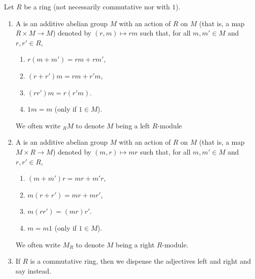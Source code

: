     \begin{definition}\label{def:modules}
        Let $R$ be a ring (not necessarily commutative nor with $1$).
        \begin{enumerate}[label = (\arabic*)]
            \item A  is an additive abelian group $M$ with an action of $R$ on $M$ (that is, a map $R \times M \rightarrow M$) denoted by $(r,m) \mapsto rm$ such that, for all $m,m' \in M$ and $r,r' \in R$,
                \begin{enumerate}[label = (\roman*)]
                    \item $r(m+m') = rm + rm'$,
                    \item $(r + r')m = rm + r'm$,
                    \item $(rr')m = r(r'm)$.
                    \item $1m = m$ \tiny (only if $1 \in M$).
                \end{enumerate}
            We often write ${}_{R}M$ to denote $M$ being a left $R$-module

            \item A  is an additive abelian group $M$ with an action of $R$ on $M$ (that is, a map $M \times R \rightarrow M$) denoted by $(m,r) \mapsto mr$ such that, for all $m,m' \in M$ and $r,r' \in R$,
                \begin{enumerate}[label = (\roman*)]
                    \item $(m+m')r = mr + m'r$,
                    \item $m(r + r') = mr + mr'$,
                    \item $m(rr') = (mr)r'$.
                    \item $m = m1$ \tiny (only if $1 \in M$).
                \end{enumerate}
            We often write $M_{R}$ to denote $M$ being a right $R$-module.

            \item If $R$ is a commutative ring, then we dispense the adjectives left and right and say  instead.
        \end{enumerate}
    \end{definition}

